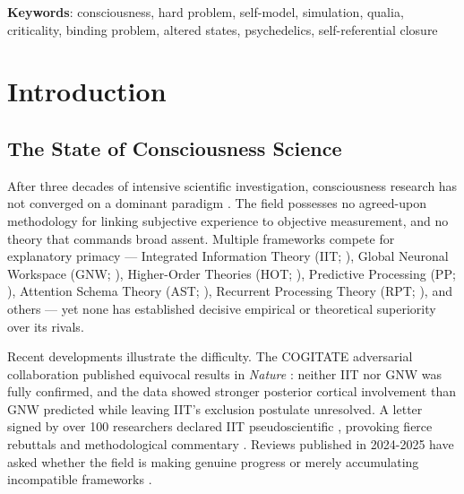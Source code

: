 \documentclass[12pt]{article}
\newcommand{\rev}[1]{#1}
\begin{document}
\noindent\textbf{Keywords}: consciousness, hard problem, self-model, simulation, qualia, criticality, binding problem, altered states, psychedelics, \rev{self-referential closure}




\section{Introduction}



\subsection{The State of Consciousness Science}


After three decades of intensive scientific investigation, consciousness research has not converged on a dominant paradigm \citep{Kuhn1962}. The field possesses no agreed-upon methodology for linking subjective experience to objective measurement, and no theory that commands broad assent. Multiple frameworks compete for explanatory primacy --- Integrated Information Theory (IIT; \citealp{Tononi2004,Albantakis2023}), Global Neuronal Workspace (GNW; \citealp{Baars1988,Dehaene2011}), Higher-Order Theories (HOT; \citealp{Rosenthal2005,Lau2011}), Predictive Processing (PP; \citealp{Friston2010,Seth2021}), Attention Schema Theory (AST; \citealp{Graziano2013}), Recurrent Processing Theory (RPT; \citealp{Lamme2006,Lamme2010}), and others --- yet none has established decisive empirical or theoretical superiority over its rivals.

Recent developments illustrate the difficulty. The COGITATE adversarial collaboration published equivocal results in \emph{Nature} \citep[protocol:][]{COGITATE2025,Melloni2023}: neither IIT nor GNW was fully confirmed, and the data showed stronger posterior cortical involvement than GNW predicted while leaving IIT's exclusion postulate unresolved. A letter signed by over 100 researchers declared IIT pseudoscientific \citep{IITConcerned2025}, provoking fierce rebuttals \citep{TononiAlbantakis2025} and methodological commentary \citep{GomezMarin2025}. Reviews published in 2024-2025 have asked whether the field is making genuine progress or merely accumulating incompatible frameworks \citep{SethBayne2022,KirkebyHinrup2025b,WagnerAltendorf2024}.
\end{document}

